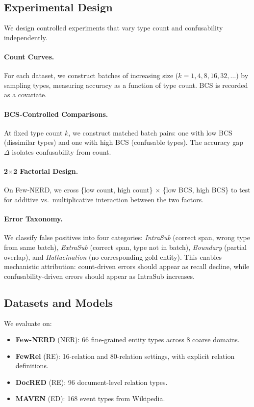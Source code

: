 \documentclass[11pt,a4paper]{article}
\begin{document}
\subsection{Experimental Design}

We design controlled experiments that vary type count and confusability independently.

\paragraph{Count Curves.}
For each dataset, we construct batches of increasing size ($k = 1, 4, 8, 16, 32, \ldots$) by sampling types, measuring accuracy as a function of type count.
BCS is recorded as a covariate.

\paragraph{BCS-Controlled Comparisons.}
At fixed type count $k$, we construct matched batch pairs: one with low BCS (dissimilar types) and one with high BCS (confusable types).
The accuracy gap $\Delta$ isolates confusability from count.

\paragraph{2$\times$2 Factorial Design.}
On Few-NERD, we cross \{low count, high count\} $\times$ \{low BCS, high BCS\} to test for additive vs.\ multiplicative interaction between the two factors.

\paragraph{Error Taxonomy.}
We classify false positives into four categories: \emph{IntraSub} (correct span, wrong type from same batch), \emph{ExtraSub} (correct span, type not in batch), \emph{Boundary} (partial overlap), and \emph{Hallucination} (no corresponding gold entity).
This enables mechanistic attribution: count-driven errors should appear as recall decline, while confusability-driven errors should appear as IntraSub increases.

\subsection{Datasets and Models}

We evaluate on:
\begin{itemize}
\item \textbf{Few-NERD} (NER): 66 fine-grained entity types across 8 coarse domains.
\item \textbf{FewRel} (RE): 16-relation and 80-relation settings, with explicit relation definitions.
\item \textbf{DocRED} (RE): 96 document-level relation types.
\item \textbf{MAVEN} (ED): 168 event types from Wikipedia.
\end{itemize}
\end{document}
